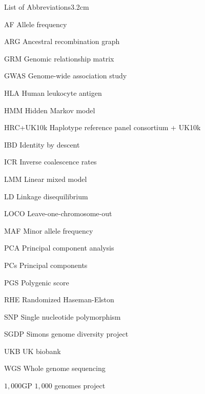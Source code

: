 \begin{mclistof}{List of Abbreviations}{3.2cm}

\item[AF] Allele frequency

\item[ARG] Ancestral recombination graph

\item[GRM] Genomic relationship matrix

\item[GWAS] Genome-wide association study

\item[HLA] Human leukocyte antigen

\item[HMM] Hidden Markov model

\item[HRC+UK10k] Haplotype reference panel consortium + UK10k

\item[IBD] Identity by descent

\item[ICR] Inverse coalescence rates

\item[LMM] Linear mixed model

\item[LD] Linkage disequilibrium

\item[LOCO] Leave-one-chromosome-out

\item[MAF] Minor allele frequency

\item[PCA] Principal component analysis

\item[PCs] Principal components

\item[PGS] Polygenic score

\item[RHE] Randomized Haseman-Elston

\item[SNP] Single nucleotide polymorphism

\item[SGDP] Simons genome diversity project

\item[UKB] UK biobank

\item[WGS] Whole genome sequencing

\item[$1{,}000$GP] $1{,}000$ genomes project
 
\end{mclistof} 
